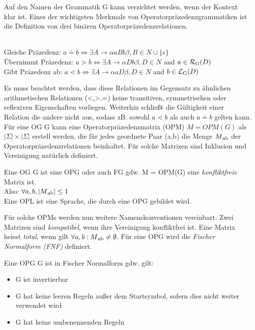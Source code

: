 Auf den Namen der Grammatik G kann verzichtet werden, wenn der Kontext klar ist. Eines der wichtigsten Merkmale von Operatorpräzedenzgrammatiken ist die Definition von drei binären Operatorpräzedenzrelationen.
\begin{definition}[Präzedenzrelationen]\ \\
Gleiche Präzedenz: $ a \doteq b \Leftrightarrow \exists A \rightarrow \alpha aBb \beta , 
		B \in N \cup \{ \epsilon \}$ \\
		Übernimmt Präzedenz: $ a \gtrdot b \Leftrightarrow \exists A \rightarrow \alpha Db \beta , D \in N $ and $ a \in
		\mathcal{R}\textsubscript{G}(D)$ \\
		Gibt Präzedenz ab: $ a \lessdot b \Leftrightarrow \exists A \rightarrow \alpha aD \beta , D \in N $ and $ b \in
		\mathcal{L}\textsubscript{G}(D)$
\end{definition}
Es muss beachtet werden, dass diese Relationen im Gegensatz zu ähnlichen arithmetischen Relationen (<,>,=) keine transitiven, symmetrischen oder reflexiven Eigenschaften vorliegen. Weiterhin schließt die Gültigkeit einer Relation die andere nicht aus, sodass zB. sowohl $a \lessdot b$ als auch $a \doteq b$ gelten kann.
Für eine OG G kann eine Operatorpräzedenzmatrix (OPM) $M = OPM(G)$ als $|\Sigma | \times |\Sigma |$ erstell werden, die für jedes geordnete Paar (a,b) die Menge $M \textsubscript{ab}$ der Operatorpräzedenzrelationen beinhaltet. Für solche Matrizen sind Inklusion und Vereinigung natürlich definiert.

\begin{definition}
Eine OG G ist eine OPG oder auch FG gdw. M = OPM(G) eine \textit{konfliktfreie} Matrix ist.\\ 
Also: $\forall a, b, |M \textsubscript{ab} | \leq 1$\\
Eine OPL ist eine Sprache, die durch eine OPG gebildet wird.
\end{definition}

Für solche OPMs werden nun weitere Namenskonventionen vereinbart. Zwei Matrizen sind \textit{kompatibel}, wenn ihre Vereinigung konfliktfrei ist. Eine Matrix heisst \textit{total}, wenn gilt $\forall a, b: M \textsubscript{ab} \neq \emptyset$.
Für eine OPG wird die \textit{Fischer Normalform (FNF)} definiert.

\begin{definition}[Fischernormalform]
Eine OPG G ist in Fischer Normalform gdw. gilt:
\begin{itemize}
\item
G ist invertierbar
\item
G hat keine leeren Regeln außer dem Startsymbol, sofern dies nicht weiter verwendet wird
\item 
G hat keine umbenennenden Regeln
\end{itemize}
\end{definition}

